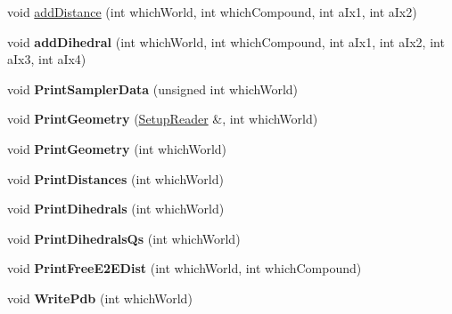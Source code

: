 \begin{DoxyCompactItemize}
\item 
void \hyperlink{classContext_a5a07ff7e7ba1f2c3e5d994bd1adea68b}{add\+Distance} (int which\+World, int which\+Compound, int a\+Ix1, int a\+Ix2)
\item 
void {\bfseries add\+Dihedral} (int which\+World, int which\+Compound, int a\+Ix1, int a\+Ix2, int a\+Ix3, int a\+Ix4)\hypertarget{classContext_a86987e7bcfe20efdcc21e08880e96e93}{}\label{classContext_a86987e7bcfe20efdcc21e08880e96e93}

\item 
void {\bfseries Print\+Sampler\+Data} (unsigned int which\+World)\hypertarget{classContext_ab9a4464e9cea0e14cf0bd5a1870fc936}{}\label{classContext_ab9a4464e9cea0e14cf0bd5a1870fc936}

\item 
void {\bfseries Print\+Geometry} (\hyperlink{classSetupReader}{Setup\+Reader} \&, int which\+World)\hypertarget{classContext_a92027c227b719b17bb3cd755a28248f7}{}\label{classContext_a92027c227b719b17bb3cd755a28248f7}

\item 
void {\bfseries Print\+Geometry} (int which\+World)\hypertarget{classContext_a5e4ae7a9a62c699d8b45c5f2ad37d42d}{}\label{classContext_a5e4ae7a9a62c699d8b45c5f2ad37d42d}

\item 
void {\bfseries Print\+Distances} (int which\+World)\hypertarget{classContext_a4f7ec354c4973e63539bc6607b66c1a3}{}\label{classContext_a4f7ec354c4973e63539bc6607b66c1a3}

\item 
void {\bfseries Print\+Dihedrals} (int which\+World)\hypertarget{classContext_ad11d3223492d5f3f232b0737cf94e596}{}\label{classContext_ad11d3223492d5f3f232b0737cf94e596}

\item 
void {\bfseries Print\+Dihedrals\+Qs} (int which\+World)\hypertarget{classContext_ac19e9df02c1b2ca025243c732aac77f9}{}\label{classContext_ac19e9df02c1b2ca025243c732aac77f9}

\item 
void {\bfseries Print\+Free\+E2\+E\+Dist} (int which\+World, int which\+Compound)\hypertarget{classContext_a682ac22b19c91cdbfbaa68044eccac72}{}\label{classContext_a682ac22b19c91cdbfbaa68044eccac72}

\item 
void {\bfseries Write\+Pdb} (int which\+World)\hypertarget{classContext_a6fac94799d42c3500d1d6975de46ba44}{}\label{classContext_a6fac94799d42c3500d1d6975de46ba44}


\end{DoxyCompactItemize}

